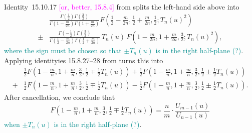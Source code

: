 \documentclass{article}
\begin{document}
Identity~15.10.17 \textcolor{magenta}{[or, better, 15.8.4]} from \cite{dlmf} splits the left-hand side above into
\begin{align*}
& \frac{\Gamma(\tfrac{1}{2}) \Gamma(\tfrac{3}{2})}{\Gamma(1 - \tfrac{m}{2n})\Gamma(1 + \tfrac{m}{2n})} F(\tfrac{1}{2} - \tfrac{m}{2n}, \tfrac{1}{2} + \tfrac{m}{2n}, \tfrac{1}{2}; T_n(u)^2) \\
\pm & \frac{\Gamma(-\tfrac{1}{2}) \Gamma(\tfrac{3}{2})}{\Gamma(\tfrac{1}{2} - \tfrac{m}{2n})\Gamma(\tfrac{1}{2} + \tfrac{m}{2n})}\,T_n(u)\,F(1 - \tfrac{m}{2n}, 1 + \tfrac{m}{2n}, \tfrac{3}{2}; T_n(u)^2),
\end{align*}
\textcolor{DarkCyan}{where the sign must be chosen so that $\pm T_n(u)$ is in the right half-plane (?)}. Applying identityies 15.8.27--28 from \cite{dlmf} turns this into
\begin{align*}
& \tfrac{1}{2} F(1 - \tfrac{m}{n}, 1 + \tfrac{m}{n}, \tfrac{3}{2}, \tfrac{1}{2} \mp \tfrac{1}{2}T_n(u)) + \tfrac{1}{2} F(1 - \tfrac{m}{n}, 1 + \tfrac{m}{n}, \tfrac{3}{2}, \tfrac{1}{2} \pm \tfrac{1}{2}T_n(u)) \\
+ & \tfrac{1}{2} F(1 - \tfrac{m}{n}, 1 + \tfrac{m}{n}, \tfrac{3}{2}, \tfrac{1}{2} \mp \tfrac{1}{2}T_n(u)) - \tfrac{1}{2} F(1 - \tfrac{m}{n}, 1 + \tfrac{m}{n}, \tfrac{3}{2}, \tfrac{1}{2} \pm \tfrac{1}{2}T_n(u)).
\end{align*}
After cancellation, we conclude that
\[ F(1 - \tfrac{m}{n}, 1 + \tfrac{m}{n}, \tfrac{3}{2}, \tfrac{1}{2} \mp \tfrac{1}{2}T_n(u)) = \frac{n}{m} \cdot \frac{U_{m-1}(u)}{U_{n-1}(u)} \]
\textcolor{DarkCyan}{when $\pm T_n(u)$ is in the right half-plane (?)}.
\end{document}
